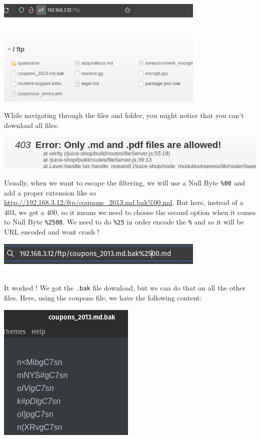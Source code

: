 \documentclass[a4paper,11pt,singlespacing]{article}
\begin{document}
\includegraphics[width=0.75\textwidth,height=0.75\textheight]{Images/Image19.png}

While navigating through the files and folder, you might notice that you
can't download all files:

\includegraphics{Images/Image20.png}

Usually, when we want to escape the filtering, we will use a Null Byte
\texttt{\%00} and add a proper extension like so
\url{http://192.168.3.12/ftp/coupons_2013.md.bak\%00.md}. But here,
instead of a 403, we get a 400, so it means we need to choose the second
option when it comes to Null Byte \texttt{\%2500}. We need to do
\texttt{\%25} in order encode the \texttt{\%} and so it will be URL
encoded and wont crash !

\includegraphics{Images/Image21.png}

It worked ! We got the \texttt{.bak} file download, but we can do that
on all the other files. Here, using the coupons file, we have the
following content:

\includegraphics{Images/Image22.png}
\end{document}
